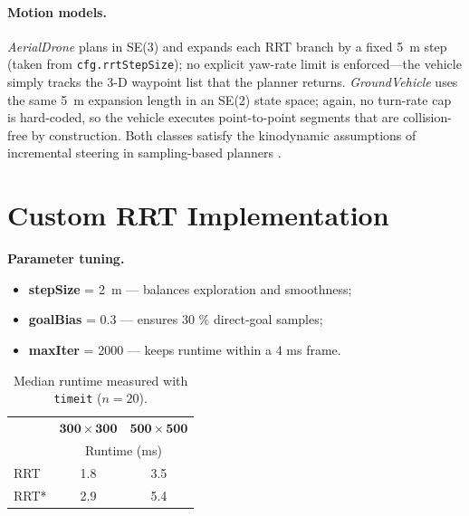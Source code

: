 \documentclass[12pt,a4paper]{report}
\begin{document}
\paragraph{Motion models.}
\emph{AerialDrone} plans in SE(3) and expands each RRT branch by a fixed
\SI{5}{\metre} step (taken from \verb|cfg.rrtStepSize|); no explicit yaw-rate
limit is enforced—the vehicle simply tracks the 3-D waypoint list that the
planner returns.  
\emph{GroundVehicle} uses the same \SI{5}{\metre} expansion length in an SE(2)
state space; again, no turn-rate cap is hard-coded, so the vehicle executes
point-to-point segments that are collision-free by construction.  
Both classes satisfy the kinodynamic assumptions of incremental steering in
sampling-based planners \cite{LaValle2001RRT,Karaman2011RRTstar}.

\section{Custom RRT Implementation}
\label{sec:path_planning}



\textbf{Parameter tuning.}
\begin{itemize}
  \item \textbf{stepSize} = \SI{2}{\metre} — balances exploration and smoothness;
  \item \textbf{goalBias} = 0.3 — ensures 30 \% direct-goal samples;
  \item \textbf{maxIter}  = 2000 — keeps runtime within a 4 ms frame.
\end{itemize}

\begin{table}[h]
  \centering
  \caption{Median runtime measured with \texttt{timeit} (\(n{=}20\)).}
  \label{tab:rtProfile}
  \begin{tabular}{lcc}
    \toprule
            & \(\mathbf{300{\times}300}\) & \(\mathbf{500{\times}500}\) \\[-1pt]
            & \multicolumn{2}{c}{Runtime (ms)} \\
    \midrule
    RRT      & 1.8 & 3.5 \\
    RRT*     & 2.9 & 5.4 \\
    \bottomrule
  \end{tabular}
\end{table}
\end{document}
